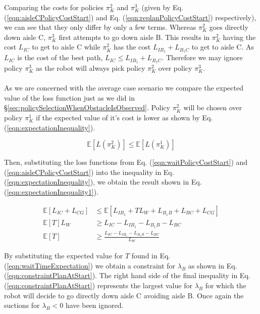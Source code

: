 \documentclass[a4paper,12pt]{article}
\begin{document}
			Comparing the costs for policies $\pi_{K}^{2}$ and $\pi_{K}^{3}$ (given by Eq. (\ref{eqn:aisleCPolicyCostStart}) and Eq. (\ref{eqn:replanPolicyCostStart}) respectively), we can see that they only differ by only a few terms. Whereas $\pi_{K}^{2}$ goes directly down aisle C, $\pi_{K}^{3}$ first attempts to go down aisle B. This results in $\pi_{K}^{2}$ having the cost $L_{IC}$ to get to aisle C while $\pi_{K}^{2}$ has the cost $L_{IB_1}+L_{B_1C}$ to get to aisle C. As $L_{IC}$ is the cost of the best path, $L_{IC} \leq L_{IB_1}+L_{B_1C}$. Therefore we may ignore policy $\pi_{K}^{3}$ as the robot will always pick policy $\pi_{K}^{2}$ over policy $\pi_{K}^{3}$.
			\\
			\\
			As we are concerned with the average case scenario we compare the expected value of the loss function just as we did in \S \ref{sec:policySelectionWhenObstacleIsObserved}. Policy $\pi_{K}^{2}$ will be chosen over policy $\pi_{K}^{1}$ if the expected value of it's cost is lower as shown by Eq. (\ref{eqn:expectationInequality}).
			
			\begin{equation}
			\mathbb{E}\left[L\left(\pi_{K}^{2}\right)\right] \leq \mathbb{E}\left[L\left(\pi_{K}^{1}\right)\right]
			\label{eqn:expectationInequality}
			\end{equation}
			
			Then, substituting the loss functions from Eq. (\ref{eqn:waitPolicyCostStart}) and (\ref{eqn:aisleCPolicyCostStart}) into the inequality in Eq. (\ref{eqn:expectationInequality}), we obtain the result shown in Eq. (\ref{eqn:expectationInequality1}).
			
			\begin{equation}
			\begin{split}
			\mathbb{E}[L_{IC}+L_{CG}] &\leq \mathbb{E}[L_{IB_1}+TL_W + L_{B_1B}+L_{BC}+L_{CG}] \\
			\mathbb{E}[T]L_W &\geq L_{IC}-L_{IB_1}-L_{B_1B}-L_{BC}\\
			\mathbb{E}[T] &\geq \frac{L_{IC}-L_{IB_1}-L_{B_1B}-L_{BC}}{L_W}
			\end{split}
			\label{eqn:expectationInequality1}
			\end{equation}
			
			By substituting the expected value for $T$ found in Eq. (\ref{eqn:waitTimeExpectation}) we obtain a constraint for $\lambda_B$ as shown in Eq. (\ref{eqn:constraintPlanAtStart}). The right hand side of the final inequality in Eq. (\ref{eqn:constraintPlanAtStart}) represents the largest value for $\lambda_B$ for which the robot will decide to go directly down aisle C avoiding aisle B. Once again the suctions for $\lambda_B < 0$ have been ignored. 
			
\end{document}
